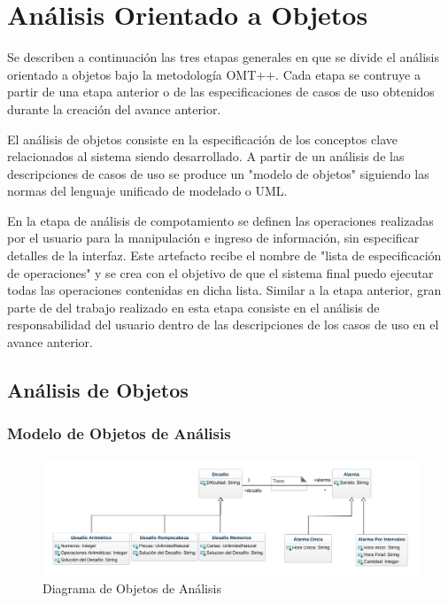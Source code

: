 \section{Análisis Orientado a Objetos}
Se describen a continuación las tres etapas generales en que se divide el análisis orientado a objetos bajo la metodología OMT++. Cada etapa se contruye a partir de una etapa anterior o de las especificaciones de casos de uso obtenidos durante la creación del avance anterior.

El análisis de objetos consiste en la especificación de los conceptos clave relacionados al sistema siendo desarrollado. A partir de un análisis de las descripciones de casos de uso se produce un "modelo de objetos" siguiendo las normas del lenguaje unificado de modelado o UML.

En la etapa de análisis de compotamiento se definen las operaciones realizadas por el usuario para la manipulación e ingreso de información, sin especificar detalles de la interfaz. Este artefacto recibe el nombre de "lista de especificación de operaciones" y se crea con el objetivo de que el sistema final puedo ejecutar todas las operaciones contenidas en dicha lista. Similar a la etapa anterior, gran parte de del trabajo realizado en esta etapa consiste en el análisis de responsabilidad del usuario dentro de las descripciones de los casos de uso en el avance anterior.

\subsection{Análisis de Objetos}


\subsubsection{Modelo de Objetos de Análisis}
\begin{figure}[H]
	\centering
	\includegraphics[page=1,width=\textwidth]{./img/uml.png}
	\caption{Diagrama de Objetos de Análisis}
        \vspace{10pt}
	\label{fig:Diagrama de Objetos de Análisis}
\end{figure}

